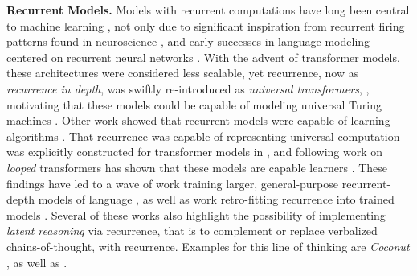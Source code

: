 \documentclass{article} %
\theoremstyle{definition}
\theoremstyle{plain}
\begin{document}
\textbf{Recurrent Models.}
Models with recurrent computations have long been central to machine learning \citep{amari_learning_1972,hopfield_neural_1982,braitenberg_vehicles_1986,gers_recurrent_2000,sutskever_recurrent_2008}, not only due to significant inspiration from recurrent firing patterns found in neuroscience \citep{hopfield_neural_1982, lamme_distinct_2000, douglas_neuronal_2004}, and early successes in language modeling centered on recurrent neural networks \citep{mikolov_recurrent_2010,sutskever_generating_2011}. With the advent of transformer models, these architectures were considered less scalable, yet recurrence, now as \textit{recurrence in depth}, was swiftly re-introduced as \textit{universal transformers}, \citet{dehghani_universal_2019}, motivating that these models could be capable of modeling universal Turing machines \citep{graves_neural_2014}. %
Other work showed that recurrent models were capable of learning algorithms \citep{schwarzschild_can_2021,bansal_end--end_2022,bear_rethinking_2024}.
That recurrence was capable of representing universal computation was explicitly constructed for transformer models in \citet{giannou_looped_2023}, and following work on \textit{looped} transformers has shown that these models are capable learners \citep{giannou_looped_2023,gatmiry_can_2024,yang_looped_2024,mcleish_transformers_2024,fan_looped_2025}. These findings have led to a wave of work training larger, general-purpose recurrent-depth models of language \citep{tan_sparse_2023,abnar_adaptivity_2023,mathur_mind_2024,csordas_moeut_2024,geiping_scaling_2025}, as well as work retro-fitting recurrence into trained models \citep{li_deep_2020,bae_relaxed_2024,hay_dynamic_2023,liu_mobilellm_2024}. Several of these works also highlight the possibility of implementing \textit{latent reasoning} via recurrence, that is to complement or replace verbalized chains-of-thought, with recurrence. Examples for this line of thinking are \textit{Coconut} \citep{hao_training_2024}, as well as \citet{liu_deliberation_2024,cheng_compressed_2024}. 
\end{document}
